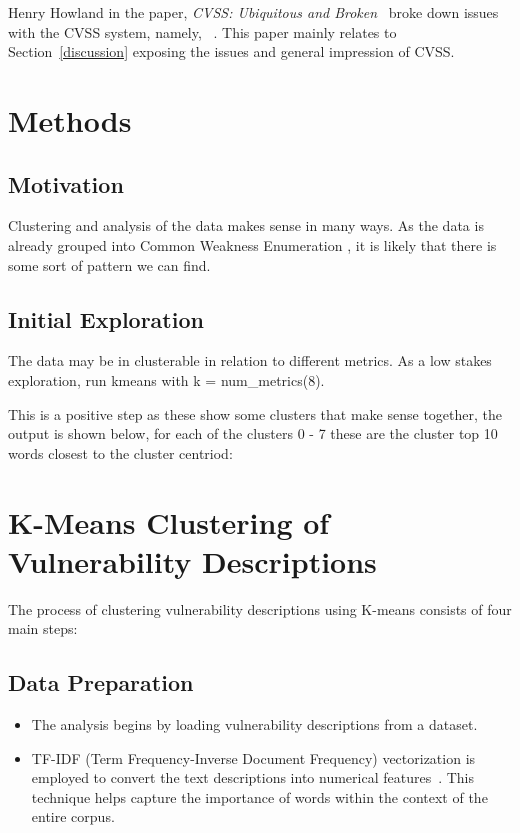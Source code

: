 \documentclass[12pt]{article}
\begin{document}
Henry Howland in the paper, \textit{CVSS: Ubiquitous and Broken}~\cite{ubiquitous} broke down issues with
the CVSS system, namely, ~\cite{ubiquitous}.  This paper mainly relates to Section~\ref{discussion} exposing the
issues and general impression of CVSS.

\section{Methods}
\subsection{Motivation}

Clustering and analysis of the data makes sense in many ways. As the data is already grouped into
Common Weakness Enumeration , it is likely that there is some sort of pattern we can find.

\subsection*{Initial Exploration}

The data may be in clusterable in relation to different metrics. As a low stakes exploration, run
kmeans\cite{kmeans} with k = num\_metrics(8).

This is a positive step as these show some clusters that make sense together, the output is shown
below, for each of the clusters 0 - 7 these are the cluster top 10 words closest to the cluster
centriod:

\section{K-Means Clustering of Vulnerability Descriptions}

The process of clustering vulnerability descriptions using K-means consists of four main steps:

\subsection{Data Preparation}

\begin{itemize}

	\item The analysis begins by loading vulnerability descriptions from a dataset.

	\item TF-IDF (Term Frequency-Inverse Document Frequency) vectorization is employed to convert
	      the text descriptions into numerical features~\cite{tfidf}. This technique helps capture the importance
	      of words within the context of the entire corpus.

\end{itemize}
\end{document}
